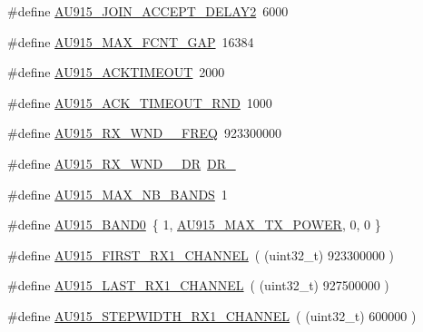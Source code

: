 \begin{DoxyCompactItemize}
\#define \hyperlink{group__REGIONAU915_ga00b42a4ecd7b4484f73a1e428652f5fc}{A\+U915\+\_\+\+J\+O\+I\+N\+\_\+\+A\+C\+C\+E\+P\+T\+\_\+\+D\+E\+L\+A\+Y2}~6000
\item 
\#define \hyperlink{group__REGIONAU915_gaf4dd6f2ba296be813e56ffc3fdcbf7ab}{A\+U915\+\_\+\+M\+A\+X\+\_\+\+F\+C\+N\+T\+\_\+\+G\+AP}~16384
\item 
\#define \hyperlink{group__REGIONAU915_ga3fc2d9d63bcd48b926612b12eaa81971}{A\+U915\+\_\+\+A\+C\+K\+T\+I\+M\+E\+O\+UT}~2000
\item 
\#define \hyperlink{group__REGIONAU915_ga093d31ebddca807195cbe6c6144258fa}{A\+U915\+\_\+\+A\+C\+K\+\_\+\+T\+I\+M\+E\+O\+U\+T\+\_\+\+R\+ND}~1000
\item 
\#define \hyperlink{group__REGIONAU915_ga0fbc056b672f0dedf7311ddfe59515b6}{A\+U915\+\_\+\+R\+X\+\_\+\+W\+N\+D\+\_\+\_\+\+F\+R\+EQ}~923300000
\item 
\#define \hyperlink{group__REGIONAU915_gab50b9056c8405c3538819bbc21b78ebf}{A\+U915\+\_\+\+R\+X\+\_\+\+W\+N\+D\+\_\+\_\+\+DR}~\hyperlink{group__REGION_ga44cc96ba80ae464cd9330b784d329c16}{D\+R\+\_}
\item 
\#define \hyperlink{group__REGIONAU915_gad166b707f964b6b057ec3bb189c35ebc}{A\+U915\+\_\+\+M\+A\+X\+\_\+\+N\+B\+\_\+\+B\+A\+N\+DS}~1
\item 
\#define \hyperlink{group__REGIONAU915_ga6e0a29afe59acad8c0b01808e984684a}{A\+U915\+\_\+\+B\+A\+N\+D0}~\{ 1, \hyperlink{group__REGIONAU915_ga36808f695e52582b8a6a3ca4b4bf61d4}{A\+U915\+\_\+\+M\+A\+X\+\_\+\+T\+X\+\_\+\+P\+O\+W\+ER}, 0,  0 \}
\item 
\#define \hyperlink{group__REGIONAU915_ga006dab0130b61538f621e80e9f6028ce}{A\+U915\+\_\+\+F\+I\+R\+S\+T\+\_\+\+R\+X1\+\_\+\+C\+H\+A\+N\+N\+EL}~( (uint32\+\_\+t) 923300000 )
\item 
\#define \hyperlink{group__REGIONAU915_gaa9d052a49ace8fc23a34e297449711be}{A\+U915\+\_\+\+L\+A\+S\+T\+\_\+\+R\+X1\+\_\+\+C\+H\+A\+N\+N\+EL}~( (uint32\+\_\+t) 927500000 )
\item 
\#define \hyperlink{group__REGIONAU915_gae66b13ecda158ed17cddb4ca5a9331f5}{A\+U915\+\_\+\+S\+T\+E\+P\+W\+I\+D\+T\+H\+\_\+\+R\+X1\+\_\+\+C\+H\+A\+N\+N\+EL}~( (uint32\+\_\+t) 600000 )
\end{DoxyCompactItemize}
